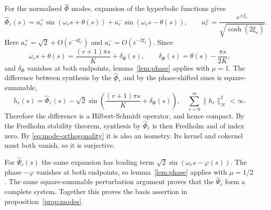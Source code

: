 For the normalised $\hat{\Phi}$ modes, expansion of the hyperbolic functions
gives
\begin{equation}
  \hat{\Phi}_r(s)=a_r^+\sin(\omega_rs+\theta(s))
  +a_r^-\sin(\omega_rs-\theta(s)),\qquad
  a_r^\pm=\frac{e^{\pm\xi_r}}{\sqrt{\cosh(2\xi_r)}}.
\end{equation}
Here $a_r^+=\sqrt2+O(e^{-4\xi_r})$ and $a_r^-=O(e^{-2\xi_r})$. Since
\begin{equation}
  \omega_rs+\theta(s)=\frac{(r+1)\pi s}{K}
  +\delta_\Phi(s),\qquad
  \delta_\Phi(s)=\theta(s)-\frac{\pi s}{2K},
\end{equation}
and $\delta_\Phi$ vanishes at both endpoints, lemma~\ref{lem:phase} applies with
$\mu=1$. The difference between synthesis by the $\hat{\Phi}_r$ and by the
phase-shifted sines is square-summable,
\begin{equation}
  h_r(s)=\hat{\Phi}_r(s)
  -\sqrt{2}\sin\left(\frac{(r+1)\pi s}{K}+\delta_\Phi (s)\right),
  \quad \sum_{r=0}^\infty \|h_r\|_\mathscr{H}^2 < \infty.
\end{equation}
Therefore the difference is a Hilbert-Schmidt operator, and hence compact. By
the Fredholm stability theorem, synthesis by $\hat{\Phi}_r$ is then Fredholm
and of index zero. By \eqref{eq:mode-orthogonality} it is also an isometry. Its
kernel and cokernel must both vanish, so it is surjective.

For $\hat{\Psi}_r(s)$ the same expansion has leading term
$\sqrt2\sin(\omega_rs-\varphi(s))$. The phase $-\varphi$ vanishes at both
endpoints, so lemma~\ref{lem:phase} applies with $\mu=1/2$. The same
square-summable perturbation argument proves that the
$\hat{\Psi}_r$ form a complete system.
Together this proves the basis assertion in proposition~\ref{prop:modes}.

